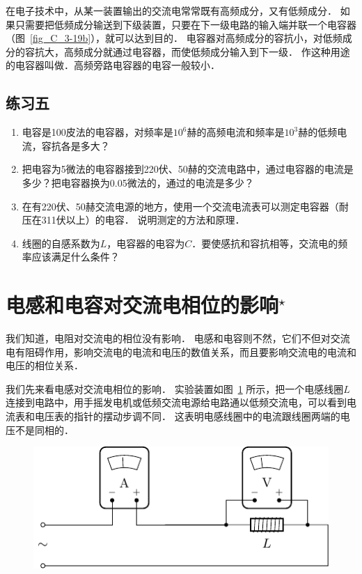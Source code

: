 在电子技术中，从某一装置输出的交流电常常既有高频成分，又有低频成分．
如果只需要把低频成分输送到下级装置，只要在下一级电路的输入端并联一个电容器（图~\ref{fig_C_3-19b}），就可以达到目的．
电容器对高频成分的容抗小，对低频成分的容抗大，高频成分就通过电容器，而使低频成分输入到下一级．
作这种用途的电容器叫做．高频旁路电容器的电容一般较小．

\subsection*{练习五}
\begin{enumerate}
    \item 电容是100皮法的电容器，对频率是$10^6$赫的高频电流和频率是$10^3$赫的低频电流，容抗各是多大？
    \item 把电容为5微法的电容器接到220伏、50赫的交流电路中，通过电容器的电流是多少？把电容器换为0.05微法的，通过的电流是多少？
    \item 在有220伏、50赫交流电源的地方，使用一个交流电流表可以测定电容器（耐压在311伏以上）的电容．
    说明测定的方法和原理．
    \item 线圈的自感系数为$L$，电容器的电容为$C$．要使感抗和容抗相等，交流电的频率应该满足什么条件？
\end{enumerate}

\section{电感和电容对交流电相位的影响$^\star$}
我们知道，电阻对交流电的相位没有影响．
电感和电容则不然，它们不但对交流电有阻碍作用，影响交流电的电流和电压的数值关系，而且要影响交流电的电流和电压的相位关系．

我们先来看电感对交流电相位的影响．
实验装置如图~\ref{fig_C_3-20} 所示，把一个电感线圈$L$连接到电路中，用手摇发电机或低频交流电源给电路通以低频交流电，可以看到电流表和电压表的指针的摆动步调不同．
这表明电感线圈中的电流跟线圈两端的电压不是同相的．
\begin{figure}[htbp]
    \centering
    \includegraphics{fig/C/3-20.pdf}
    \caption{}\label{fig_C_3-20}
\end{figure}

